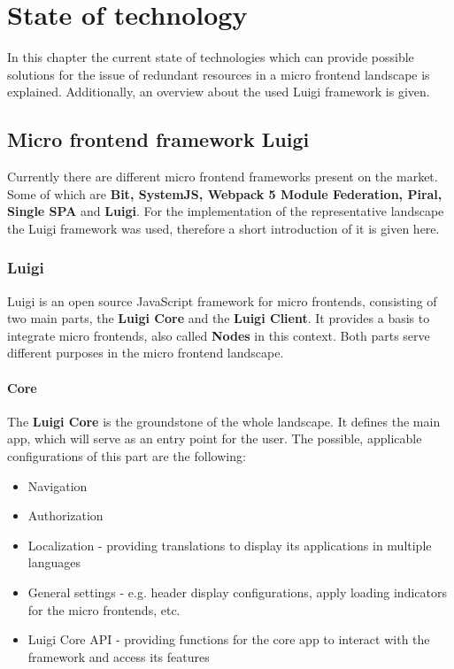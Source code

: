 \chapter{State of technology} %
\label{Chapter2}


In this chapter the current state of technologies which can provide possible solutions for the issue of redundant resources in a micro frontend landscape is explained. Additionally, an overview about the used Luigi framework is given.

\section{Micro frontend framework Luigi}
\label{mf_framework_luigi}

Currently there are different micro frontend frameworks present on the market. Some of which are \textbf{Bit, SystemJS, Webpack 5 Module Federation, Piral, Single SPA} and \textbf{Luigi}.\cite{top10_mffs}
For the implementation of the representative landscape the Luigi framework was used, therefore a short introduction of it is given here.

\subsection{Luigi}

Luigi is an open source JavaScript framework for micro frontends, consisting of two main parts, the \textbf{Luigi Core} and the \textbf{Luigi Client}. It provides a basis to integrate micro frontends, also called \textbf{Nodes} in this context. Both parts serve different purposes in the micro frontend landscape.\cite{luigi_doc_overview}

\subsubsection{Core}

The \textbf{Luigi Core} is the groundstone of the whole landscape. It defines the main app, which will serve as an entry point for the user. The possible, applicable configurations of this part are the following:

\begin{itemize}[noitemsep]
	\item Navigation
	\item Authorization
	\item Localization - providing translations to display its applications in multiple languages
	\item General settings - e.g. header display configurations, apply loading indicators for the micro frontends, etc.
	\item Luigi Core API - providing functions for the core app to interact with the framework and access its features
\end{itemize} 

